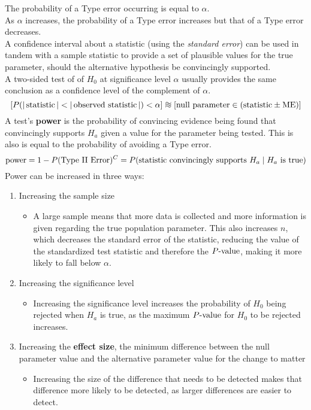 \documentclass[../AP_Statistics.tex]{subfiles}
\begin{document}
		The probability of a Type  error occurring is equal to $\alpha$. \\
		As $\alpha$ increases, the probability of a Type  error increases but that of a Type  error decreases. \\
		A confidence interval about a statistic (using the \emph{standard error}) can be used in tandem with a sample statistic to provide a set of plausible values for the true parameter, should the alternative hypothesis be convincingly supported. \\
		A two-sided test of of $H_0$ at significance level $\alpha$ usually provides the same conclusion as a confidence level of the complement of $\alpha$.
		\[[P(\mathrm{|\s| < |\os|}) < \alpha] \approxident [\text{null parameter} \in (\text{statistic} \pm \ME)]\]
		A test's \textbf{power} is the probability of convincing evidence being found that convincingly supports $H_a$ given a value for the parameter being tested. This is also is equal to the probability of avoiding a Type  error. 
		\[\mathrm{power} = 1 - P(\text{Type \Roman{2} Error})^C = P(\text{statistic convincingly supports } H_a \mid H_a \text{ is true})\]
		Power can be increased in three ways:
		\begin{enumerate}
			\item 
				Increasing the sample size
				\begin{itemize}
					\item 
						A large sample means that more data is collected and more information is given regarding the true population parameter. This also increases $n$, which decreases the standard error of the statistic, reducing the value of the standardized test statistic and therefore the $P\text{-value}$, making it more likely to fall below $\alpha$.
				\end{itemize}
			\item 
				Increasing the significance level
				\begin{itemize}
					\item 
						Increasing the significance level increases the probability of $H_0$ being rejected when $H_a$ is true, as the maximum $P\text{-value}$ for $H_0$ to be rejected increases.
				\end{itemize}
			\item 
				Increasing the \textbf{effect size}, the minimum difference between the null parameter value and the alternative parameter value for the change to matter
				\begin{itemize}
					\item 
						Increasing the size of the difference that needs to be detected makes that difference more likely to be detected, as larger differences are easier to detect.
				\end{itemize}
		\end{enumerate}
\end{document}
